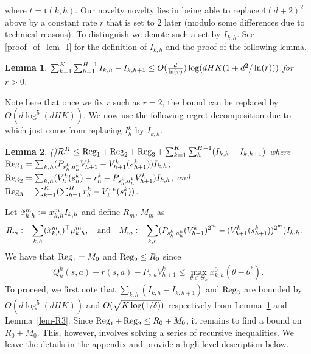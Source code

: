 \documentclass{article}
\newtheorem{lemma}{Lemma}
\def\sft{\mathsf{t}}
\newcommand{\blue}[1]{{\color[rgb]{.3,.5,1}#1}}
\renewcommand{\blue}[1]{#1}
\begin{document}
where $t=\sft(k,h)$.
Our novelty novelty lies in being able to replace $4(d+2)^2$ above by a constant rate $r$ that is set to 2 later (modulo some differences due to technical reasons).
To distinguish  we denote such a set by $I_{k,h}$. See \ref{proof_of_lem_I} for the definition of $I_{k,h}$ and the proof of the following lemma.
\begin{lemma}\label{lem-I}
  $\sum_{k=1}^K\sum_{h=1}^{H-1} I_{k,h} - I_{k,h+1}  \le  O({ \frac{d}{\ln(r)} }) \log(dHK(1+d^2/\ln(r)))$ for $r>0$.
\end{lemma}
Note here that once we fix $r$ such as $r=2$, the bound can be replaced by $O(d\log^5(dHK))$.
We now use the following regret decomposition due to~\cite{zhang21variance} which just come from replacing $I_h^k$ by $I_{k,h}$.
\begin{lemma}(\citet{zhang21variance})\label{lem:decomp}
$
    \mathcal{R}^K\le \operatorname{{\text{Reg}}}_1 +\operatorname{{\text{Reg}}}_2 + \operatorname{{\text{Reg}}}_3 + 
    \sum_{k=1}^K\sum_{h}^{H-1} (I_{k,h} - I_{k,h+1})
$
where 
$\operatorname{{\text{Reg}}}_1 =\sum_{k,h} (P_{s_h^k,a_h^k}V_{h+1}^k-V_{h+1}^k(s_{h+1}^k))I_{k,h}$, $\operatorname{{\text{Reg}}}_2 = \sum_{k,h}(V_h^k(s_h^k)-r_h^k-P_{s_h^k,a_h^k}V_{h+1}^k)I_{k,h}$, and $\operatorname{{\text{Reg}}}_3=\sum_{k=1}^K (\sum_{h=1}^H r_h^k-V_1^{\pi_k}(s_1^k))$.
\end{lemma}
%
Let $\blue{\Breve x_{k,h}^m} :=x_{k,h}^m I_{k,h}$ and define
$R_m$, $M_m$ as
\begin{align*}
    \blue{R_m} &:= \sum_{k,h} (\Breve x_{k,h}^m)^\T \mu_{k,h}^m,\quad\text{and}\quad
    \blue{M_m}:=\sum_{k,h} (P_{s_h^k,a_h^k}(V_{h+1}^k)^{2^m}-(V_{h+1}^k(s_{h+1}^k))^{2^m})I_{k,h}.
\end{align*} 
We have that $\operatorname{{\text{Reg}}}_1 = M_0$ and $\operatorname{{\text{Reg}}}_2 \le R_0$ since
\begin{align*}
    Q_h^k(s,a)-r(s,a)-P_{s,a}V_{h+1}^k\le \max_{\theta\in\Theta_k} x_{k,h}^0(\theta-\theta^*).
\end{align*}
%
To proceed, we first note that $\sum_{k,h} (I_{k,h} - I_{k,h+1})$ and $\operatorname{{\text{Reg}}}_3$ are bounded by  
$O(d \log^5(dHK))$ and $ O(\sqrt{K\log(1/{\delta})})$ respectively from Lemma~\ref{lem-I} and Lemma~\ref{lem-R3}.
Since $\operatorname{{\text{Reg}}}_1 + \operatorname{{\text{Reg}}}_2 \le R_0 +M_0$, it remains to find a bound on $R_0+M_0$.
This, however, involves solving a series of recursive inequalities. %
We leave the details in the appendix and provide a high-level description below.
\end{document}
